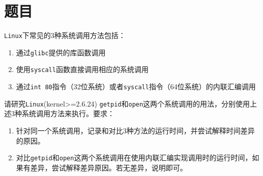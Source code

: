 \section{题目}

{\tt Linux}下常见的3种系统调用方法包括：

\begin{enumerate}
    \item 通过{\tt glibc}提供的库函数调用
    \item 使用{\tt syscall}函数直接调用相应的系统调用
    \item 通过{\tt int 80}指令（32位系统）或者{\tt syscall}指令（64位系统）的内联汇编调用
\end{enumerate}

请研究{\tt Linux}(kernel>=2.6.24) {\tt getpid}和{\tt open}这两个系统调用的用法，分别使用上述3种系统调用方法来执行。要求：

\begin{enumerate}
    \item 针对同一个系统调用，记录和对比3种方法的运行时间，并尝试解释时间差异的原因。
    \item 对比{\tt getpid}和{\tt open}这两个系统调用在使用内联汇编实现调用时的运行时间，如果有差异，尝试解释差异原因。若无差异，说明即可。
\end{enumerate}
